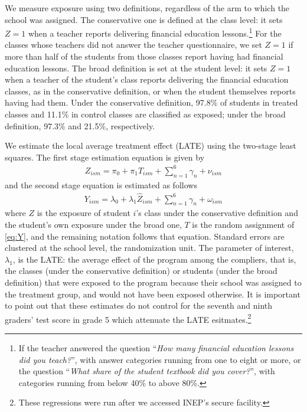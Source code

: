 We measure exposure using two definitions, regardless of the arm to which the school was assigned. The conservative one is defined at the class level: it sets $Z=1$ when a teacher reports delivering financial education lessons.\footnote{If the teacher answered the question ``\textit{How many financial education lessons did you teach?}'', with answer categories running from one to eight or more, or the question ``\textit{What share of the student textbook did you cover?}'', with categories running from below 40\% to above 80\%.} For the classes whose teachers did not answer the teacher questionnaire, we set $Z=1$ if more than half of the students from those classes report having had financial education lessons. The broad definition is set at the student level: it sets $Z=1$ when a teacher of the student's class reports delivering the financial education classes, as in the conservative definition, or when the student themselves reports having had them. Under the conservative definition, 97.8\% of students in treated classes and 11.1\% in control classes are classified as exposed; under the broad definition, 97.3\% and 21.5\%, respectively.

We estimate the local average treatment effect (LATE) using the two-stage least squares. The first stage estimation equation is given by
\begin{align}
     Z_{ism} = \pi_0 + \pi_1 T_{ism} + \sum_{n=1}^{6} \gamma_n + \nu_{ism}
     \label{eq:Y2}
\end{align}
and the second stage equation is estimated as follows
\begin{align}
    Y_{ism} = \lambda_0 + \lambda_1 \widehat{Z}_{ism} + \sum_{n=1}^{6} \gamma_n + \omega_{ism}
    \label{eq:Y3}
\end{align}
\noindent
where $Z$ is the exposure of student $i$'s class under the conservative definition and the student's own exposure under the broad one, $T$ is the random assignment of \autoref{eq:Y}, and the remaining notation follows that equation. Standard errors are clustered at the school level, the randomization unit. The parameter of interest, $\lambda_1$, is the LATE: the average effect of the program among the compliers, that is, the classes (under the conservative definition) or students (under the broad definition) that were exposed to the program because their school was assigned to the treatment group, and would not have been exposed otherwise. It is important to point out that these estimates do not control for the seventh and ninth graders' test score in grade 5 which attenuate the LATE esitmates.\footnote{These regressions were run after we accessed INEP's secure facility.}  


